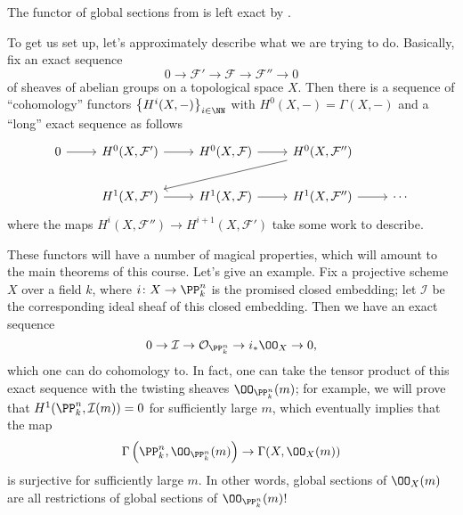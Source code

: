 \documentclass[../notes.tex]{subfiles}
\begin{document}
\begin{example}
	The functor of global sections from  is left exact by \cite[Exercise~II.1.8]{hartshorne}.
\end{example}
To get us set up, let's approximately describe what we are trying to do. Basically, fix an exact sequence
\[0\to\mathcal F'\to\mathcal F\to\mathcal F''\to0\]
of sheaves of abelian groups on a topological space $X$. Then there is a sequence of ``cohomology'' functors $\left\{H^i(X,-)\right\}_{i\in\NN}$ with $H^0(X,-)=\Gamma(X,-)$ and a ``long'' exact sequence as follows
\[\begin{tikzcd}
	0 & {H^0(X,\mathcal F')} & {H^0(X,\mathcal F)} & {H^0(X,\mathcal F'')} \\
	& {H^1(X,\mathcal F')} & {H^1(X,\mathcal F)} & {H^1(X,\mathcal F'')} & \cdots
	\arrow[from=1-1, to=1-2]
	\arrow[from=1-2, to=1-3]
	\arrow[from=1-3, to=1-4]
	\arrow[from=1-4, to=2-2]
	\arrow[from=2-2, to=2-3]
	\arrow[from=2-3, to=2-4]
	\arrow[from=2-4, to=2-5]
\end{tikzcd}\]
where the maps $H^i(X,\mathcal F'')\to H^{i+1}(X,\mathcal F')$ take some work to describe.
\begin{remark}
	These functors will have a number of magical properties, which will amount to the main theorems of this course. Let's give an example. Fix a projective scheme $X$ over a field $k$, where $i\colon X\to\PP^n_k$ is the promised closed embedding; let $\mathcal I$ be the corresponding ideal sheaf of this closed embedding. Then we have an exact sequence
	\[0\to\mathcal I\to\mathcal O_{\PP^n_k}\to i_*\OO_X\to0,\]
	which one can do cohomology to. In fact, one can take the tensor product of this exact sequence with the twisting sheaves $\OO_{\PP^n_k}(m)$; for example, we will prove that $H^1(\PP^n_k,\mathcal I(m))=0$ for sufficiently large $m$, which eventually implies that the map
	\[\Gamma\left(\PP^n_k,\OO_{\PP^n_k}(m)\right)\to\Gamma(X,\OO_X(m))\]
	is surjective for sufficiently large $m$. In other words, global sections of $\OO_X(m)$ are all restrictions of global sections of $\OO_{\PP^n_k}(m)$!
\end{remark}
\end{document}
